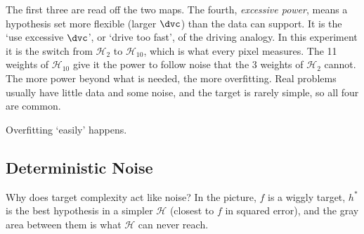 The first three are read off the two maps. The fourth, \emph{excessive
power}, means a hypothesis set more flexible (larger \(\dvc\)) than the data
can support. It is the `use excessive \(\dvc\)', or `drive too fast', of the
driving analogy. In this experiment it is the switch from \(\mathcal{H}_2\) to
\(\mathcal{H}_{10}\), which is what every pixel measures. The 11 weights of
\(\mathcal{H}_{10}\) give it the power to follow noise that the 3 weights of
\(\mathcal{H}_2\) cannot. The more power beyond what is needed, the more
overfitting. Real problems usually have little data and some noise, and the
target is rarely simple, so all four are common.

\begin{moral}
    Overfitting `easily' happens.
\end{moral}

\subsection{Deterministic Noise}

Why does target complexity act like noise? In the picture, \(f\) is a wiggly
target, \(h^*\) is the best hypothesis in a simpler \(\mathcal{H}\) (closest to
\(f\) in squared error), and the gray area between them is what \(\mathcal{H}\)
can never reach.

\begin{center}
\end{center}


